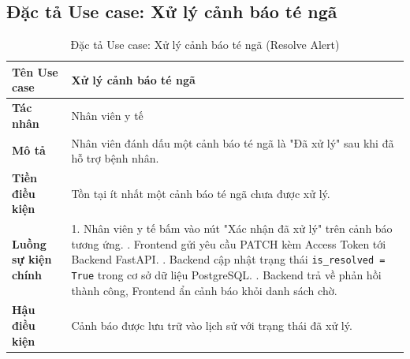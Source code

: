 \documentclass[../DoAn.tex]{subfiles}
\begin{document}
\subsection{Đặc tả Use case: Xử lý cảnh báo té ngã}
\begin{table}[H]
    \centering
    \caption{Đặc tả Use case: Xử lý cảnh báo té ngã (Resolve Alert)}
    \label{tab:uc_xu_ly_canh_bao}
    \begin{tabular}{|p{4cm}|p{10.5cm}|}
        \hline
        \textbf{Tên Use case} & \textbf{Xử lý cảnh báo té ngã} \\ \hline
        \textbf{Tác nhân} & Nhân viên y tế \\ \hline
        \textbf{Mô tả} & Nhân viên đánh dấu một cảnh báo té ngã là "Đã xử lý" sau khi đã hỗ trợ bệnh nhân. \\ \hline
        \textbf{Tiền điều kiện} & Tồn tại ít nhất một cảnh báo té ngã chưa được xử lý. \\ \hline
        \textbf{Luồng sự kiện chính} &
        1. Nhân viên y tế bấm vào nút "Xác nhận đã xử lý" trên cảnh báo tương ứng. \newline
        2. Frontend gửi yêu cầu PATCH kèm Access Token tới Backend FastAPI. \newline
        3. Backend cập nhật trạng thái \texttt{is\_resolved = True} trong cơ sở dữ liệu PostgreSQL. \newline
        4. Backend trả về phản hồi thành công, Frontend ẩn cảnh báo khỏi danh sách chờ. \\ \hline
        \textbf{Hậu điều kiện} & Cảnh báo được lưu trữ vào lịch sử với trạng thái đã xử lý. \\ \hline
    \end{tabular}
\end{table}
\end{document}
